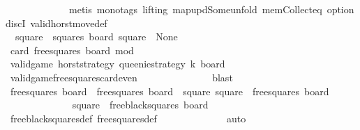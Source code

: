 \begin{isabellebody}
\ \ \ \ \ \ \ \ \ \ \ \ \ {\isacharparenleft}metis\ {\isacharparenleft}mono{\isacharunderscore}tags{\isacharcomma}\ lifting{\isacharparenright}\ map{\isacharunderscore}upd{\isacharunderscore}Some{\isacharunderscore}unfold\ mem{\isacharunderscore}Collect{\isacharunderscore}eq\ option{\isachardot}discI\ valid{\isacharunderscore}horst{\isacharunderscore}move{\isacharprime}{\isacharunderscore}def{\isacharparenright}\isanewline
\isanewline
\ \ \ \ \ \ \ \ \isamarkupfalse%
\isanewline
\isanewline
\ \ \ \ \ \ \ \ \isamarkupfalse%
\ {\isachardoublequoteopen}{\isasymexists}\ square\ {\isasymin}\ squares{\isachardot}\ {\isacharquery}board{}\ square\ {\isacharequal}\ None{\isachardoublequoteclose}\isanewline
\ \ \ \ \ \ \ \ \isamarkupfalse%
{\isacharminus}\isanewline
\ \ \ \ \ \ \ \ \ \ \isamarkupfalse%
\ {\isachardoublequoteopen}card\ {\isacharparenleft}free{\isacharunderscore}squares\ board{\isacharparenright}\ mod\ {}\ {\isacharequal}\ {}{\isachardoublequoteclose}\isanewline
\ \ \ \ \ \ \ \ \ \ \ \ \isamarkupfalse%
\ {\isacartoucheopen}valid{\isacharunderscore}game\ {\isacharquery}horst{\isacharunderscore}strategy\ queenie{\isacharunderscore}strategy\ k\ board{\isacartoucheclose}\isanewline
\ \ \ \ \ \ \ \ \ \ \ \ \isamarkupfalse%
\ valid{\isacharunderscore}game{\isacharunderscore}free{\isacharunderscore}squares{\isacharunderscore}card{\isacharunderscore}even\ \isanewline
\ \ \ \ \ \ \ \ \ \ \ \ \isamarkupfalse%
\ blast\isanewline
\ \ \ \ \ \ \ \ \ \ \isamarkupfalse%
\ {\isachardoublequoteopen}free{\isacharunderscore}squares\ board\ {\isacharequal}\ free{\isacharunderscore}squares\ {\isacharquery}board{}\ {\isasymunion}\ {\isacharbraceleft}square{\isacharbraceright}{\isachardoublequoteclose}\ {\isachardoublequoteopen}square\ {\isasymnotin}\ free{\isacharunderscore}squares\ {\isacharquery}board{}{\isachardoublequoteclose}\isanewline
\ \ \ \ \ \ \ \ \ \ \ \ \isamarkupfalse%
\ {\isacharbackquoteopen}square\ {\isasymin}\ free{\isacharunderscore}black{\isacharunderscore}squares\ board{\isacharbackquoteclose}\isanewline
\ \ \ \ \ \ \ \ \ \ \ \ \isamarkupfalse%
\ free{\isacharunderscore}black{\isacharunderscore}squares{\isacharunderscore}def\ free{\isacharunderscore}squares{\isacharunderscore}def\isanewline
\ \ \ \ \ \ \ \ \ \ \ \ \isamarkupfalse%
\ auto\isanewline
\ \ \ \ \ \ \ \ \ \ \isamarkupfalse%

\end{isabellebody}
